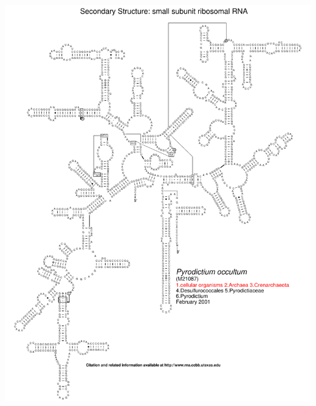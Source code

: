 \documentclass[landscape]{slides}
\begin{document}
\begin{slide}\begin{center}\includegraphics[height=8in]{figs/arc-18}\end{center}\vfill\end{slide}
\end{document}
